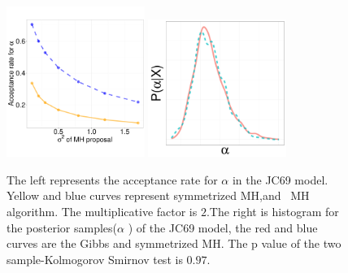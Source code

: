   \begin{figure}[H]
  \centering

  \begin{minipage}[!hp]{0.99\linewidth}
  	\centering
    \includegraphics [width=0.40\textwidth, angle=0]{figs/acc/JCalpha_k2.pdf}
	\hspace{.5in}
    \includegraphics [width=0.40\textwidth, angle=0]{figs/JC_ks/jc_hist_44_05_3_.pdf}
  \end{minipage}
    \caption{The left represents the acceptance rate for $\alpha$ in the JC69 model.  Yellow and blue curves represent symmetrized MH,and \naive\ MH  algorithm. The multiplicative factor is $2$.The right is histogram for the posterior samples($\alpha$ ) of the JC69 model, the red and blue curves are the Gibbs and symmetrized MH. The p value of the two sample-Kolmogorov Smirnov test is $ 0.97$.  }
     \label{fig:ACC_JC}
  \end{figure}

